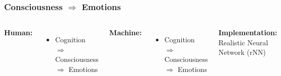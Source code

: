 \documentclass[12pt, aspectratio=169]{beamer}
\begin{document}
\begin{frame}
\frametitle{Consciousness $\Rightarrow$ Emotions}
\begin{columns}[c] %

\textbf{Human:}
\begin{itemize}
\item Cognition $\Rightarrow$ Consciousness $\Rightarrow$ Emotions
\end{itemize}

\textbf{Machine:}
\begin{itemize}
\item Cognition $\Rightarrow$ Consciousness $\Rightarrow$ Emotions
\end{itemize}

\textbf{Implementation:}
Realistic Neural Network (rNN) 

\begin{figure}
\includegraphics[width=0.8\linewidth]{Kismet_312}
\end{figure}
\end{columns}
\end{frame}

\end{document}
